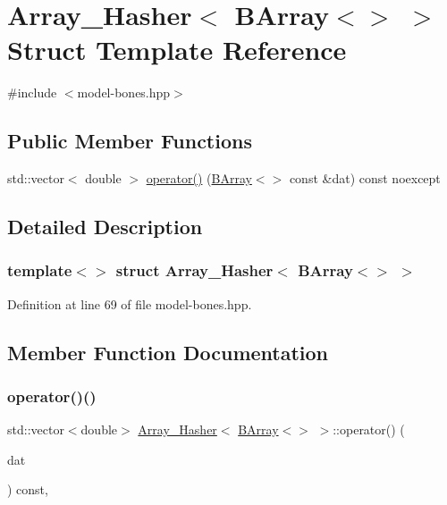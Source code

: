 \hypertarget{struct_array___hasher_3_01_b_array_3_4_01_4}{}\section{Array\+\_\+\+Hasher$<$ B\+Array$<$$>$ $>$ Struct Template Reference}
\label{struct_array___hasher_3_01_b_array_3_4_01_4}


{\ttfamily \#include $<$model-\/bones.\+hpp$>$}

\subsection*{Public Member Functions}
\begin{DoxyCompactItemize}
\item 
std\+::vector$<$ double $>$ \hyperlink{struct_array___hasher_3_01_b_array_3_4_01_4_a5a40ad373242142e6e8ca77611fb1be3}{operator()} (\hyperlink{class_b_array}{B\+Array}$<$$>$ const \&dat) const noexcept
\end{DoxyCompactItemize}


\subsection{Detailed Description}
\subsubsection*{template$<$$>$\newline
struct Array\+\_\+\+Hasher$<$ B\+Array$<$$>$ $>$}



Definition at line 69 of file model-\/bones.\+hpp.



\subsection{Member Function Documentation}
\mbox{\label{struct_array___hasher_3_01_b_array_3_4_01_4_a5a40ad373242142e6e8ca77611fb1be3}} 
\subsubsection{\texorpdfstring{operator()()}{operator()()}}
{\footnotesize\ttfamily std\+::vector$<$double$>$ \hyperlink{struct_array___hasher}{Array\+\_\+\+Hasher}$<$ \hyperlink{class_b_array}{B\+Array}$<$$>$ $>$\+::operator() (\begin{DoxyParamCaption}\item[{\hyperlink{class_b_array}{B\+Array}$<$$>$ const \&}]{dat }\end{DoxyParamCaption}) const\hspace{0.3cm}{\ttfamily [inline]}, {\ttfamily [noexcept]}}



